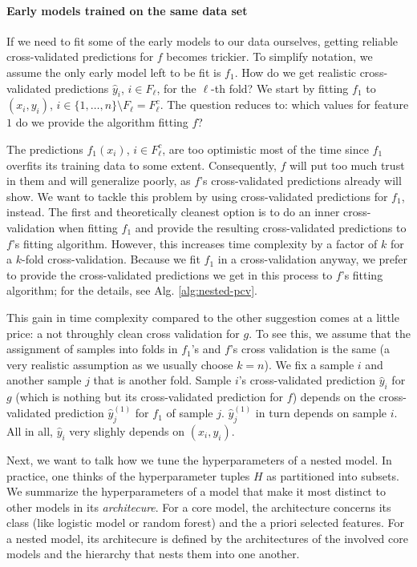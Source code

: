 \paragraph{Early models trained on the same data set}
If we need to fit some of the early models to our data ourselves, getting reliable cross-validated 
predictions
for $f$ becomes trickier. To simplify notation, we assume the only early model left to be fit is 
$f_1$. How do 
we get realistic cross-validated predictions $\hat{y}_i$, $i \in F_\ell$, for the $\ell$-th fold? 
We start by fitting $f_1$ to $(x_i, y_i)$, $i \in \{ 1, \ldots, n \} \setminus F_\ell = F_\ell^c$.
The question reduces to: which values for feature $1$ do we provide the algorithm fitting $f$?

The predictions $f_1(x_i)$, $i \in F_\ell^c$, are too optimistic most of the time since 
$f_1$ overfits its training data to some extent. Consequently, $f$ will put too much
trust in them and will generalize poorly, as $f$'s cross-validated predictions already will 
show. We want to tackle this problem by using cross-validated predictions for $f_1$, instead.
The first and theoretically cleanest option is to do an inner cross-validation when fitting $f_1$ 
and provide the resulting cross-validated predictions to $f$'s fitting algorithm. However, this 
increases time complexity by a factor of $k$ for a $k$-fold cross-validation.
Because we fit $f_1$ in a cross-validation anyway, we prefer to provide the cross-validated 
predictions we get in this process to $f$'s fitting algorithm; for the details, see 
Alg. \ref{alg:nested-pcv}. 



This gain in time complexity compared to the other suggestion comes at a little price: a not 
throughly clean cross validation for $g$. To see this, we assume that the assignment of samples 
into folds in $f_1$'s and $f$'s cross validation is the same (a very realistic assumption as we 
usually choose $k = n$). We fix a sample $i$ and another sample $j$ that is another fold. 
Sample $i$'s cross-validated prediction $\hat{y}_i$ for $g$ (which is nothing but its 
cross-validated prediction for $f$) depends on the cross-validated 
prediction $\hat{y}_j^{(1)}$ for $f_1$ of sample $j$. $\hat{y}_j^{(1)}$ in turn depends on sample 
$i$. All in all, $\hat{y}_i$ very slighly depends on $(x_i, y_i)$.

Next, we want to talk how we tune the hyperparameters of a nested model. In practice, one thinks of 
the hyperparameter tuples $H$ as partitioned into subsets. We summarize the
hyperparameters of a model that make it most distinct to other models in its \textit{architecure}. 
For a core model, the architecture concerns its class (like logistic model or random forest) and 
the a priori selected features. For a nested model, its architecure is defined by the architectures 
of the involved core models and the hierarchy that nests them into one another.

